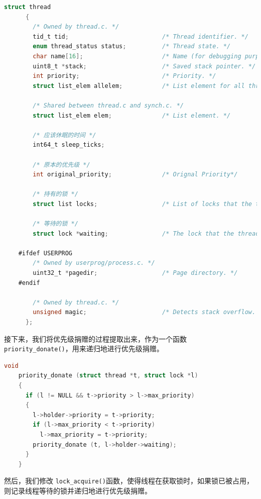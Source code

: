 \documentclass{article}
\begin{document}
\begin{lstlisting}[language=C, title=修改后的线程结构体]
      struct thread
      {
        /* Owned by thread.c. */
        tid_t tid;                          /* Thread identifier. */
        enum thread_status status;          /* Thread state. */
        char name[16];                      /* Name (for debugging purposes). */
        uint8_t *stack;                     /* Saved stack pointer. */
        int priority;                       /* Priority. */
        struct list_elem allelem;           /* List element for all threads list. */

        /* Shared between thread.c and synch.c. */
        struct list_elem elem;              /* List element. */

        /* 应该休眠的时间 */
        int64_t sleep_ticks;

        /* 原本的优先级 */
        int original_priority;              /* Orignal Priority*/

        /* 持有的锁 */
        struct list locks;                  /* List of locks that the thread is holding. */

        /* 等待的锁 */
        struct lock *waiting;               /* The lock that the thread is waiting for. */

    #ifdef USERPROG
        /* Owned by userprog/process.c. */
        uint32_t *pagedir;                  /* Page directory. */
    #endif

        /* Owned by thread.c. */
        unsigned magic;                     /* Detects stack overflow. */
      };
\end{lstlisting}

接下来，我们将优先级捐赠的过程提取出来，作为一个函数 \texttt{priority\_donate()}，用来递归地进行优先级捐赠。

\begin{lstlisting}[language=C, title=优先级捐赠函数]
    void
    priority_donate (struct thread *t, struct lock *l)
    {
      if (l != NULL && t->priority > l->max_priority)
      {
        l->holder->priority = t->priority;
        if (l->max_priority < t->priority)
          l->max_priority = t->priority;
        priority_donate (t, l->holder->waiting);
      }
    }

\end{lstlisting}

然后，我们修改 \texttt{lock\_acquire()}函数，使得线程在获取锁时，如果锁已被占用，则记录线程等待的锁并递归地进行优先级捐赠。
\end{document}
